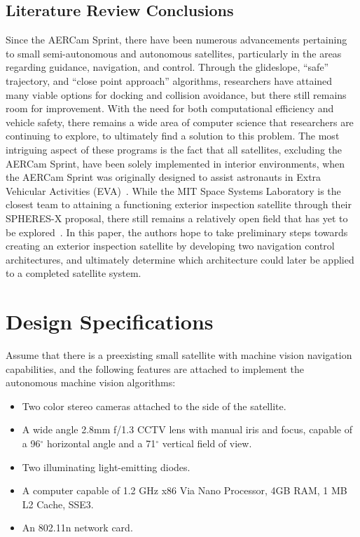 \documentclass[journal, 10pt]{IEEEtran}
\begin{document}
\subsection{Literature Review Conclusions}
Since the AERCam Sprint, there have been numerous advancements pertaining to small semi-autonomous and autonomous satellites, particularly in the areas regarding guidance, navigation, and control. Through the glideslope, ``safe'' trajectory, and ``close point approach'' algorithms, researchers have attained many viable options for docking and collision avoidance, but there still remains room for improvement. With the need for both computational efficiency and vehicle safety, there remains a wide area of computer science that researchers are continuing to explore, to ultimately find a solution to this problem. The most intriguing aspect of these programs is the fact that all satellites, excluding the AERCam Sprint, have been solely implemented in interior environments, when the AERCam Sprint was originally designed to assist astronauts in Extra Vehicular Activities (EVA)~\cite{Aercam, MiniAercam}. While the MIT Space Systems Laboratory is the closest team to attaining a functioning exterior inspection satellite through their SPHERES-X proposal, there still remains a relatively open field that has yet to be explored~\cite{SPHERES}. In this paper, the authors hope to take preliminary steps towards creating an exterior inspection satellite by developing two navigation control architectures, and ultimately determine which architecture could later be applied to a completed satellite system.

\section{Design Specifications}
Assume that there is a preexisting small satellite with machine vision navigation capabilities, and the following features are attached to implement the autonomous machine vision algorithms:
\begin{itemize}
\item Two color stereo cameras attached to the side of the satellite.
\item A wide angle 2.8mm f/1.3 CCTV lens with manual iris and focus, capable of a 96$^{\circ}$ horizontal angle and a 71$^{\circ}$ vertical field of view.
\item Two illuminating light-emitting diodes.
\item A computer capable of 1.2 GHz x86 Via Nano Processor, 4GB RAM, 1 MB L2 Cache, SSE3.
\item An 802.11n network card.
\end{itemize}
\cite{Vertigo2, Vertigo3, virt_sim, lens}
\end{document}

